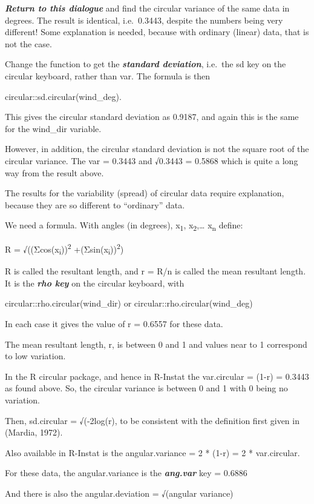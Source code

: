 \documentclass[
  letterpaper,
  DIV=11,
  numbers=noendperiod]{scrreprt}
\begin{document}
\textbf{\emph{Return to this dialogue}} and find the circular variance
of the same data in degrees. The result is identical, i.e.~0.3443,
despite the numbers being very different! Some explanation is needed,
because with ordinary (linear) data, that is not the case.

Change the function to get the \textbf{\emph{standard deviation}},
i.e.~the sd key on the circular keyboard, rather than var. The formula
is then

circular::sd.circular(wind\_deg).

This gives the circular standard deviation as 0.9187, and again this is
the same for the wind\_dir variable.

However, in addition, the circular standard deviation is not the square
root of the circular variance. The var = 0.3443 and √0.3443 = 0.5868
which is quite a long way from the result above.

The results for the variability (spread) of circular data require
explanation, because they are so different to ``ordinary'' data.

We need a formula. With angles (in degrees), x\textsubscript{1},
x\textsubscript{2},\ldots{} x\textsubscript{n} define:

R = √((Σcos(x\textsubscript{i}))\textsuperscript{2}
+(Σsin(x\textsubscript{i}))\textsuperscript{2})

R is called the resultant length, and r = R/n is called the mean
resultant length. It is the \textbf{\emph{rho key}} on the circular
keyboard, with

circular::rho.circular(wind\_dir) or circular::rho.circular(wind\_deg)

In each case it gives the value of r = 0.6557 for these data.

The mean resultant length, r, is between 0 and 1 and values near to 1
correspond to low variation.

In the R circular package, and hence in R-Instat the var.circular =
(1-r) = 0.3443 as found above. So, the circular variance is between 0
and 1 with 0 being no variation.

Then, sd.circular = √(-2log(r), to be consistent with the definition
first given in (Mardia, 1972).

Also available in R-Instat is the angular.variance = 2 * (1-r) = 2 *
var.circular.

For these data, the angular.variance is the \textbf{\emph{ang.var}} key
= 0.6886

And there is also the angular.deviation = √(angular variance)
\end{document}
